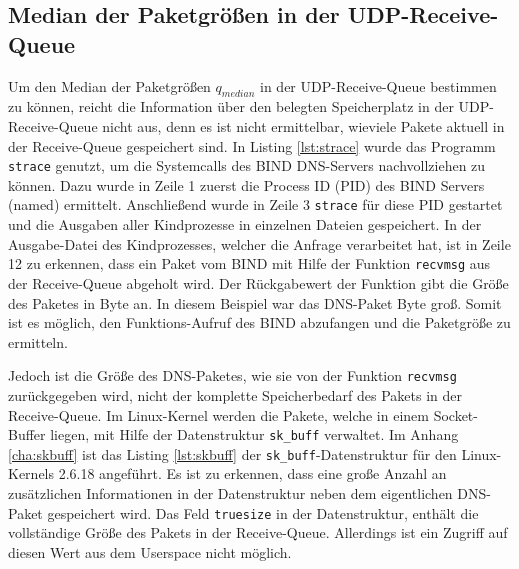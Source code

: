 \documentclass[a4paper, 12pt, BCOR10mm, DIV12, toc=bibliography, toc=listof, german]{scrbook}
\begin{document}

		\subsection*{Median der Paketgrößen in der UDP-Receive-Queue} %

		Um den Median der Paketgrößen $q_{median}$ in der UDP-Receive-Queue bestimmen zu können, reicht
		die Information über den belegten Speicherplatz in der UDP-Receive-Queue nicht aus, denn es ist
		nicht ermittelbar, wieviele Pakete aktuell in der Receive-Queue gespeichert sind. In Listing
		\ref{lst:strace} wurde das Programm \texttt{strace} genutzt, um die Systemcalls des BIND
		DNS-Servers nachvollziehen zu können. Dazu wurde in Zeile 1 zuerst die Process ID (PID) des BIND
		Servers (named) ermittelt. Anschließend wurde in Zeile 3 \texttt{strace} für diese PID gestartet
		und die Ausgaben aller Kindprozesse in einzelnen Dateien gespeichert. In der Ausgabe-Datei des
		Kindprozesses, welcher die Anfrage verarbeitet hat, ist in Zeile 12 zu erkennen, dass ein Paket
		vom BIND mit Hilfe der Funktion \texttt{recvmsg} aus der Receive-Queue abgeholt wird. Der
		Rückgabewert der Funktion gibt die Größe des Paketes in Byte an. In diesem Beispiel war das
		DNS-Paket \unit[45]{Byte} groß. Somit ist es möglich, den Funktions-Aufruf des BIND abzufangen
		und die Paketgröße zu ermitteln.

		

		Jedoch ist die Größe des DNS-Paketes, wie sie von der Funktion \texttt{recvmsg}
		zurückgegeben wird, nicht der komplette Speicherbedarf des Pakets in der Receive-Queue. Im
		Linux-Kernel werden die Pakete, welche in einem Socket-Buffer liegen, mit Hilfe der
		Datenstruktur \texttt{sk\_buff} verwaltet. Im Anhang \ref{cha:skbuff} ist das Listing
		\ref{lst:skbuff} der \texttt{sk\_buff}-Datenstruktur für den Linux-Kernels 2.6.18 angeführt. Es ist
		zu erkennen, dass eine große Anzahl an zusätzlichen Informationen in der Datenstruktur neben
		dem eigentlichen DNS-Paket gespeichert wird. Das Feld \texttt{truesize} in der Datenstruktur,
		enthält die vollständige Größe des Pakets in der Receive-Queue. Allerdings ist ein Zugriff auf
		diesen Wert aus dem Userspace nicht möglich.
\end{document}
